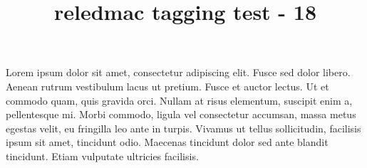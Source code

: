 \documentclass{article}
\title{reledmac tagging test - 18}
\begin{document}
\beginnumbering
\pstart
Lorem ipsum dolor sit amet, consectetur adipiscing elit. Fusce sed dolor libero. Aenean rutrum vestibulum lacus ut pretium. Fusce et auctor lectus. Ut et commodo quam, quis gravida orci. Nullam at risus elementum, suscipit enim a, pellentesque mi. Morbi commodo, ligula vel consectetur accumsan, massa metus egestas velit, eu fringilla leo ante in turpis. Vivamus ut tellus sollicitudin, facilisis ipsum sit amet, tincidunt odio. Maecenas tincidunt dolor sed ante blandit tincidunt. Etiam vulputate ultricies facilisis.
\pend
\endnumbering
\end{document}
